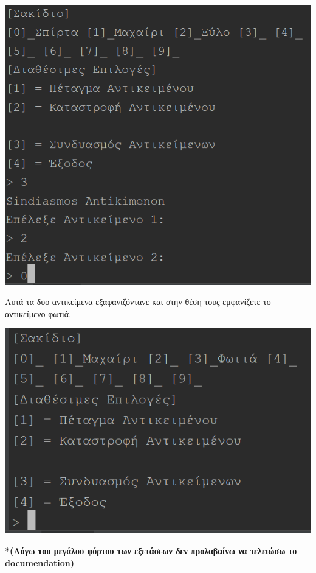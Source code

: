 \begin{center}
			\includegraphics[width=1\textwidth]{image/3.6.PNG}
\end{center}

\noindent
Αυτά τα δυο αντικείμενα εξαφανιζόντανε και στην θέση τους εμφανίζετε το αντικείμενο φωτιά.

\begin{center}
			\includegraphics[width=1\textwidth]{image/3.7.PNG}
\end{center}


\textbf{*(Λόγω του μεγάλου φόρτου των εξετάσεων δεν προλαβαίνω να τελειώσω το documendation)}